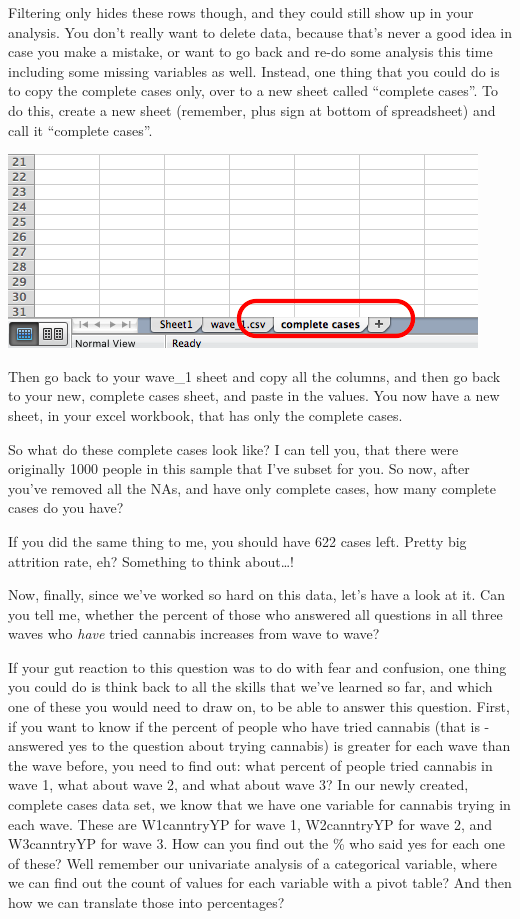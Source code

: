 \documentclass[]{book}
\theoremstyle{definition}
\theoremstyle{definition}
\theoremstyle{definition}
\theoremstyle{remark}
\begin{document}
Filtering only hides these rows though, and they could still show up in
your analysis. You don't really want to delete data, because that's
never a good idea in case you make a mistake, or want to go back and
re-do some analysis this time including some missing variables as well.
Instead, one thing that you could do is to copy the complete cases only,
over to a new sheet called ``complete cases''. To do this, create a new
sheet (remember, plus sign at bottom of spreadsheet) and call it
``complete cases''.

\includegraphics{imgs/cc_new_sheet.png}

Then go back to your wave\_1 sheet and copy all the columns, and then go
back to your new, complete cases sheet, and paste in the values. You now
have a new sheet, in your excel workbook, that has only the complete
cases.

So what do these complete cases look like? I can tell you, that there
were originally 1000 people in this sample that I've subset for you. So
now, after you've removed all the NAs, and have only complete cases, how
many complete cases do you have?

If you did the same thing to me, you should have 622 cases left. Pretty
big attrition rate, eh? Something to think about\ldots{}!

Now, finally, since we've worked so hard on this data, let's have a look
at it. Can you tell me, whether the percent of those who answered all
questions in all three waves who \emph{have} tried cannabis increases
from wave to wave?

If your gut reaction to this question was to do with fear and confusion,
one thing you could do is think back to all the skills that we've
learned so far, and which one of these you would need to draw on, to be
able to answer this question. First, if you want to know if the percent
of people who have tried cannabis (that is - answered yes to the
question about trying cannabis) is greater for each wave than the wave
before, you need to find out: what percent of people tried cannabis in
wave 1, what about wave 2, and what about wave 3? In our newly created,
complete cases data set, we know that we have one variable for cannabis
trying in each wave. These are W1canntryYP for wave 1, W2canntryYP for
wave 2, and W3canntryYP for wave 3. How can you find out the \% who said
yes for each one of these? Well remember our univariate analysis of a
categorical variable, where we can find out the count of values for each
variable with a pivot table? And then how we can translate those into
percentages?
\end{document}
